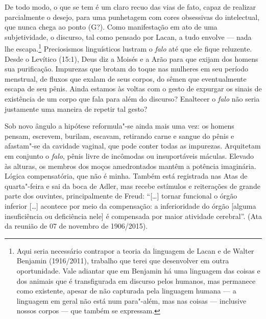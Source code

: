 De todo modo, o que se tem é um claro recuo das vias de fato, capaz de
realizar parcialmente o desejo, para uma punhetagem com cores obsessivas
do intelectual, que nunca chega ao ponto (G?). Como manifestação em ato
de uma subjetividade, o discurso, tal como pensado por Lacan, a tudo
envolve --- nada lhe escapa.\footnote{Aqui seria necessário contrapor a
  teoria da linguagem de Lacan e de Walter Benjamin (1916/2011),
  trabalho que terei que desenvolver em outra oportunidade. Vale
  adiantar que em Benjamin há uma linguagem das coisas e dos animais que
  é transfigurada em discurso pelos humanos, mas permanece como
  existente, apesar de não capturada pela linguagem humana --- a
  linguagem em geral não está num para"-além, mas nas coisas --- inclusive
  nossos corpos --- que também se expressam.} Preciosismos linguísticos
lustram o \emph{falo} até que ele fique reluzente. Desde o Levítico
(15:1), Deus diz a Moisés e a Arão para que exijam dos homens sua
purificação. Impurezas que brotam do toque nas mulheres em seu período
menstrual, de fluxos que exalam de seus corpos, do sêmen que
eventualmente escapa de seu pênis. Ainda estamos às voltas com o gesto
de expurgar os sinais de existência de um corpo que fala para além do
discurso? Enaltecer o \emph{falo} não seria justamente uma maneira de
repetir tal gesto?

Sob novo ângulo a hipótese reformula"-se ainda mais uma vez: os homens
pensam, escrevem, burilam, escavam, retirando carne e sangue do pênis e
afastam"-se da cavidade vaginal, que pode conter todas as impurezas.
Arquitetam em conjunto o \emph{falo}, pênis livre de incômodas ou
insuportáveis máculas. Elevado às alturas, os membros dos moços
amedrontados mantêm a potência imaginária. Lógica compensatória, que não
é minha. Também está registrada nas Atas de quarta"-feira e sai da boca
de Adler, mas recebe estímulos e reiterações de grande parte dos
ouvintes, principalmente de Freud: ``{[}\ldots{}{]} tornar funcional o órgão
inferior {[}\ldots{}{]} acontece por meio da compensação: a inferioridade do
órgão {[}alguma insuficiência ou deficiência nele{]} é compensada por
maior atividade cerebral''. (Ata da reunião de 07 de novembro de
1906/2015).

